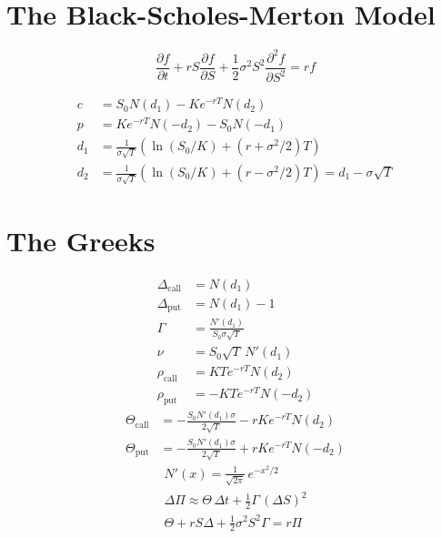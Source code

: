 
\section{The Black-Scholes-Merton Model}

\begin{equation*}
  \frac{\partial f}{\partial t}
  + rS\frac{\partial f}{\partial S}
  + \frac{1}{2}\sigma^2 S^2 \frac{\partial^2 f}{\partial S^2}
  = rf
\end{equation*}

\noindent{}
\begin{align*}
  c   &= S_0 N(d_1) - Ke^{-rT}N(d_2)\\
  p   &= Ke^{-rT}N(-d_2) - S_0 N(-d_1)\\
  d_1 &= \frac{1}{\sigma\sqrt{T}} (\ln(S_0/K)+(r+\sigma^2/2)T)\\
  d_2 &= \frac{1}{\sigma\sqrt{T}}(\ln(S_0/K)+(r-\sigma^2/2)T) = d_1 - \sigma \sqrt{T}
\end{align*}


\section{The Greeks}
\begin{align*}
  \Delta_{\text{call}} &= N(d_1) \\
  \Delta_{\text{put}}  &= N(d_1) - 1 \\
  \Gamma               &= \frac{N'(d_1)}{S_0\sigma\sqrt{T}} \\
  \nu                  &= S_0\sqrt{T}\,N'(d_1) \\
  \rho_{\text{call}}   &= KTe^{-rT}N(d_2) \\
  \rho_{\text{put}}    &= -KTe^{-rT}N(-d_2)
\end{align*}
\begin{align*}
  \Theta_{\text{call}} &= -\frac{S_0 N'(d_1)\sigma}{2\sqrt{T}} - rKe^{-rT}N(d_2) \\
  \Theta_{\text{put}}  &= -\frac{S_0 N'(d_1)\sigma}{2\sqrt{T}} + rKe^{-rT}N(-d_2)
\end{align*}
\begin{gather*}
  N'(x) = \frac{1}{\sqrt{2\pi}}\,e^{-x^2/2} \\[2pt]
  \Delta\Pi \approx \Theta\,\Delta t + \tfrac{1}{2}\Gamma\,(\Delta S)^2 \\[2pt]
  \Theta + rS\Delta + \tfrac{1}{2}\sigma^2 S^2 \Gamma = r\Pi
\end{gather*}